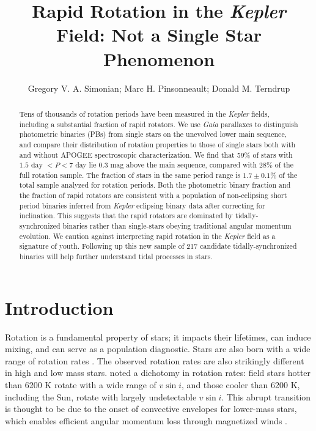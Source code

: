 \documentclass[twocolumn]{aastex6}
\newcommand{\vsini}{\ensuremath{v \sin i}}
\newcommand{\Kepler}{\mbox{\textit{Kepler}}}
\newcommand{\Gaia}{\mbox{\textit{Gaia}}}
\begin{document}
\title{Rapid Rotation in the \Kepler{} Field: Not a Single Star
Phenomenon}
\author{Gregory V. A. Simonian; Marc H. Pinsonneault; Donald M. Terndrup}

\begin{abstract}
    Tens of thousands of rotation periods have been measured in the
    \Kepler{} fields, including a substantial fraction of rapid rotators. We 
    use \Gaia{} parallaxes to distinguish photometric binaries (PBs) from
    single stars on the unevolved lower main sequence, and compare their
    distribution of rotation properties to those of single stars both with and 
    without APOGEE spectroscopic characterization. We find that 59\% of stars
    with \(1.5 \textrm{ day } < P < 7\) day lie 0.3 mag above the main
    sequence, compared with 28\% of the full rotation sample. The fraction of 
    stars in the same period range is \(1.7 \pm 0.1\%\) of the total sample 
    analyzed for rotation periods. Both the photometric binary fraction
    and the fraction of rapid rotators are consistent with a population of 
    non-eclipsing short period binaries inferred from \Kepler{} eclipsing 
    binary data after correcting for inclination. This suggests that the rapid rotators 
    are dominated by tidally-synchronized binaries rather than single-stars 
    obeying traditional angular momentum evolution. We caution against 
    interpreting rapid rotation in the \Kepler{} field as a signature of youth. 
    Following up this new sample of 217 candidate tidally-synchronized binaries 
    will help further understand tidal processes in stars.
\end{abstract}

\section{Introduction}

Rotation is a fundamental property of stars; it impacts their lifetimes, can
induce mixing, and can serve as a population diagnostic. Stars are also born 
with a wide range of rotation rates \citep{Attridge92, Herbst00, Henderson12}.
The observed rotation rates are also strikingly different in high and low mass 
stars. \citet{Kraft67} noted a dichotomy in rotation rates: field stars 
hotter than 6200 K rotate with a wide range of \vsini, and those cooler than 
6200 K, including the Sun, rotate with largely undetectable \vsini. This abrupt transition is thought to
be due to the onset of convective envelopes for lower-mass stars, which 
enables efficient angular momentum loss through magnetized winds 
\citep{Parker58,Weber67}.
\end{document}
